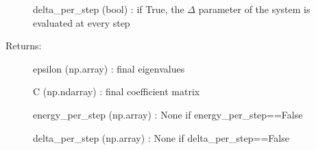 \documentclass[letterpaper,10pt,english]{sphinxmanual}
\begin{document}
\begin{fulllineitems}
\begin{fulllineitems}
\begin{description}
delta\_per\_step (bool) : if True, the \(\Delta\) parameter of the system is evaluated at every step

\item[{Returns:}] \leavevmode
epsilon (np.array) : final eigenvalues

C (np.ndarray) : final coefficient matrix

energy\_per\_step (np.array) : None if energy\_per\_step==False

delta\_per\_step (np.array) : None if delta\_per\_step==False

\end{description}

\end{fulllineitems}


\end{fulllineitems}

\end{document}
